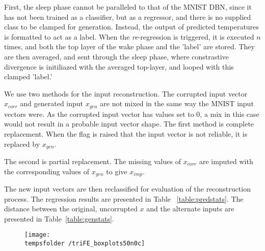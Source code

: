 First, the sleep phase cannot be paralleled to that of the MNIST DBN, since it has not been trained as a classifier, but as a regressor, and there is no supplied class to be clamped for generation. Instead, the output of predicted temperatures is formatted to act as a label. When the \textit{re}-regression is triggered, it is executed $n$ times, and both the top layer of the wake phase and the 'label' are stored. They are then averaged, and sent through the sleep phase, where constrastive divergence is initiliazed with the averaged top-layer, and looped with this clamped 'label.'  

We use two methods for the input reconstruction. The corrupted input vector $x_{corr}$ and generated input $x_{gen}$ are not mixed in the same way the MNIST input vectors were. As the corrupted input vector has values set to 0, a mix in this case would not result in a probable input vector shape. The first method is complete replacement. When the flag is raised that the input vector is not reliable, it is replaced by $x_{gen}$. 

The second is partial replacement. The missing values of $x_{corr}$ are imputed with the corresponding values of $x_{gen}$ to give $x_{imp}$.

The new input vectors are then reclassified for evaluation of the reconstruction process. The regression results are presented in Table ~\ref{table:predstats}. The distance between the original, uncorrupted $x$ and the alternate inputs are presented in Table~\ref{table:genstats}.

\begin{figure}
	\begin{center}
		\texttt{[image: \\tempsfolder /triFE\_boxplots50n0c]}
	\end{center}
\end{figure}


